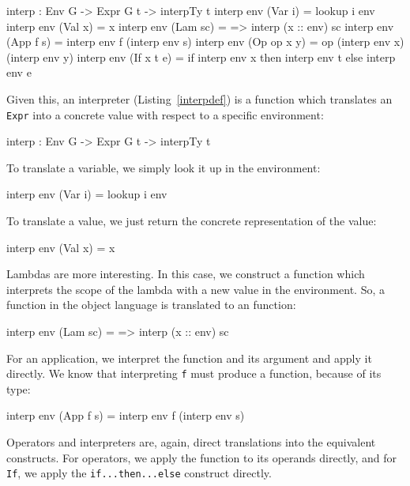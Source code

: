 \begin{code}[caption={Intepreter definition},label=interpdef]
interp : Env G -> Expr G t -> interpTy t
interp env (Var i)     = lookup i env
interp env (Val x)     = x
interp env (Lam sc)    = \x => interp (x :: env) sc
interp env (App f s)   = interp env f (interp env s)
interp env (Op op x y) = op (interp env x) (interp env y)
interp env (If x t e)  = if interp env x then interp env t
                                         else interp env e
\end{code}

\noindent
Given this, an interpreter (Listing~\ref{interpdef}) is a function which translates an \texttt{Expr} into a concrete \Idris{} value with respect to a specific environment:

\begin{code}
interp : Env G -> Expr G t -> interpTy t
\end{code}

\noindent
To translate a variable, we simply look it up in the environment:

\begin{code}
interp env (Var i) = lookup i env
\end{code}

\noindent
To translate a value, we just return the concrete representation of the value:

\begin{code}
interp env (Val x) = x
\end{code}

\noindent
Lambdas are more interesting.
In this case, we construct a function which interprets the scope of the lambda with a new value in the environment.
So, a function in the object language is translated to an \Idris{} function:

\begin{code}
interp env (Lam sc) = \x => interp (x :: env) sc
\end{code}

\noindent
For an application, we interpret the function and its argument and apply it directly.
We know that interpreting \texttt{f} must produce a function, because of its type:

\begin{code}
interp env (App f s) = interp env f (interp env s)
\end{code}

\noindent
Operators and interpreters are, again, direct translations into the equivalent \Idris{} constructs.
For operators, we apply the function to its operands directly, and for \texttt{If}, we apply the \Idris{} \texttt{if...then...else} construct directly.

